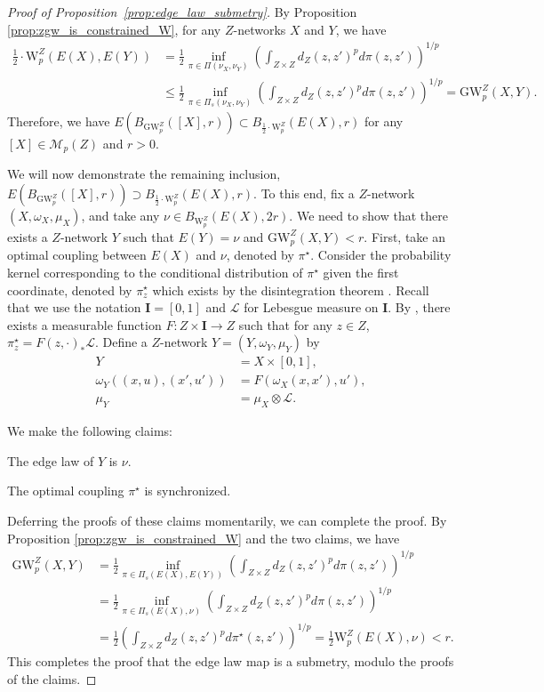 \documentclass{article}
\theoremstyle{definition}
\newcommand{\M}{\mathcal{M}}
\newcommand{\MZp}{\M_p(Z)}
\newcommand{\dgwz}{\mathrm{GW}_p^Z}
\newcommand{\wz}{\mathrm{W}_p^Z}
\begin{document}
\begin{proof}[Proof of Proposition~\ref{prop:edge_law_submetry}]
    By Proposition \ref{prop:zgw_is_constrained_W}, for any $Z$-networks $X$ and $Y$, we have
    \begin{align}
        \frac{1}{2} \cdot \wz(E(X), E(Y)) &= \frac{1}{2}\inf_{\pi \in \Pi(\nu_X,\nu_Y)} \left(\int_{Z \times Z} d_Z(z, z')^p d\pi(z, z')\right)^{1/p} \\
        &\leq \frac{1}{2}\inf_{\pi \in \Pi_{s}(\nu_X,\nu_Y)} \left(\int_{Z \times Z} d_Z(z, z')^p d\pi(z, z')\right)^{1/p} = \dgwz(X, Y).
    \end{align}
    Therefore, we have $E(B_{\dgwz}([X], r)) \subset B_{\frac{1}{2} \cdot \wz}(E(X), r)$ for any $[X]\in \MZp$ and $r > 0$. 
    
    We will now demonstrate the remaining inclusion, $E(B_{\dgwz}([X], r)) \supset B_{\frac{1}{2} \cdot \wz}(E(X), r)$. To this end, fix a $Z$-network $(X,\omega_X,\mu_X)$, and take any $\nu \in B_{\wz}(E(X), 2r)$. We need to show that there exists a $Z$-network $Y$ such that $E(Y) = \nu$ and $\dgwz(X, Y) < r$. First, take an optimal coupling between $E(X)$ and $\nu$, denoted by $\pi^\star$. Consider the probability kernel corresponding to the conditional distribution of $\pi^\star$ given the first coordinate, denoted by $\pi_z^\star$ which exists by the disintegration theorem \cite[Theorem 3.4]{kallenberg2002foundations}. Recall that we use the notation $\mathbf{I} = [0,1]$ and $\mathscr{L}$ for Lebesgue measure on $\mathbf{I}$. By \cite[Lemma 3.2]{kallenberg2002foundations}, there exists a measurable function $F:Z\times \mathbf{I} \to Z$ such that for any $z\in Z$, $\pi_z^\star = F(z,\cdot)_\ast \mathscr{L}$. Define a $Z$-network $Y = (Y, \omega_Y, \mu_Y)$ by
    \begin{align}
        Y &= X \times [0,1], \\
        \omega_Y((x, u), (x', u')) &= F(\omega_X(x, x'), u'), \\
        \mu_Y &= \mu_X \otimes \mathscr{L}.
    \end{align}
    
    We make the following claims:

    \smallskip
     The edge law of $Y$ is $\nu$.

    \smallskip
     The optimal coupling $\pi^\star$ is synchronized.

    \smallskip
    Deferring the proofs of these claims momentarily, we can complete the proof. By Proposition \ref{prop:zgw_is_constrained_W} and the two claims, we have
    \begin{align}
        \dgwz(X, Y) &= \frac{1}{2}\inf_{\pi \in \Pi_s(E(X), E(Y))}\left(\int_{Z \times Z} d_Z(z, z')^p d\pi(z, z')\right)^{1/p} \\
        &= \frac{1}{2}\inf_{\pi \in \Pi_s(E(X), \nu)}\left(\int_{Z \times Z} d_Z(z, z')^p d\pi(z, z')\right)^{1/p} \\
        &= \frac{1}{2}\left(\int_{Z \times Z} d_Z(z, z')^p d\pi^\star(z, z')\right)^{1/p} = \frac{1}{2}\wz(E(X), \nu) < r.
    \end{align}
    This completes the proof that the edge law map is a submetry, modulo the proofs of the claims.


\end{proof}
\end{document}
